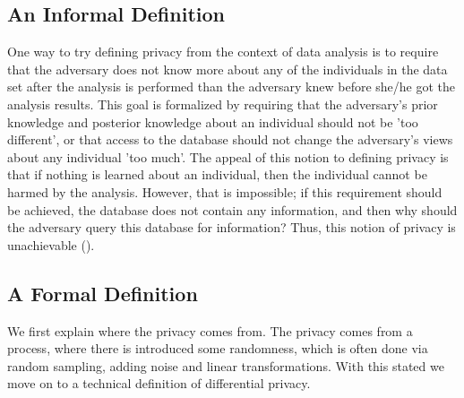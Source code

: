 \documentclass[11pt]{article}
\theoremstyle{definition}
\begin{document}
\subsection{An Informal Definition}   
One way to try defining privacy from the context of data analysis is to require that the adversary does not know more about any of the individuals in the data set after the analysis is performed than the adversary knew before she/he got the analysis results. This goal is formalized by requiring that the adversary's prior knowledge and posterior knowledge about an individual should not be 'too different', or that access to the database should not change the adversary's views about any individual 'too much'.
The appeal of this notion to defining privacy is that if nothing is learned about an individual, then the individual cannot be harmed by the analysis. However, that is impossible; if this requirement should be achieved, the database does not contain any information, and then why should the adversary query this database for information? Thus, this notion of privacy is unachievable (\cite[13]{algo_fun}). 


\subsection{A Formal Definition}\label{form}
We first explain where the privacy comes from. The privacy comes from a process, where there is introduced some randomness, which is often done via random sampling, adding noise and linear transformations. With this stated we move on to a technical definition of differential privacy.
\end{document}

